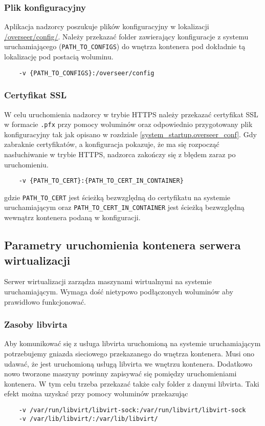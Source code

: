 \documentclass[../opis-rozwiazania.tex]{subfiles}
\begin{document}
\subsubsection{Plik konfiguracyjny}
Aplikacja nadzorcy poszukuje plików konfiguracyjny w lokalizacji \url{/overseer/config/}.
Należy przekazać folder zawierający konfiguracje z systemu uruchamiającego (\texttt{PATH\_TO\_CONFIGS}) do wnętrza kontenera pod dokładnie tą lokalizację pod postacią woluminu.
\begin{verbatim}
	-v {PATH_TO_CONFIGS}:/overseer/config
\end{verbatim}

\subsubsection{Certyfikat SSL}
W celu uruchomienia nadzorcy w trybie HTTPS należy przekazać certyfikat SSL w formacie \texttt{.pfx} przy pomocy woluminów oraz odpowiednio przygotowany plik konfiguracyjny tak jak opisano w rozdziale \ref{system_startup.overseer_conf}.
Gdy zabraknie certyfikatów, a konfiguracja pokazuje, że ma się rozpocząć nasłuchiwanie w trybie HTTPS, nadzorca zakończy się z błędem zaraz po uruchomieniu.

\begin{verbatim}
	-v {PATH_TO_CERT}:{PATH_TO_CERT_IN_CONTAINER}
\end{verbatim}
gdzie \texttt{PATH\_TO\_CERT} jest ścieżką bezwzględną do certyfikatu na systemie uruchamiającym oraz \texttt{PATH\_TO\_CERT\_IN\_CONTAINER} jest ścieżką bezwzględną wewnątrz kontenera podaną w konfiguracji.

\subsection{Parametry uruchomienia kontenera serwera wirtualizacji}
Serwer wirtualizacji zarządza maszynami wirtualnymi na systemie uruchamiającym.
Wymaga dość nietypowo podłączonych woluminów aby prawidłowo funkcjonować.

\subsubsection{Zasoby libvirta}
Aby komunikować się z usługa libvirta uruchomioną na systemie uruchamiającym potrzebujemy gniazda sieciowego przekazanego do wnętrza kontenera.
Musi ono udawać, że jest uruchomioną usługą libvirta we wnętrzu kontenera.
Dodatkowo nowo tworzone maszyny powinny zapisywać się pomiędzy uruchomieniami kontenera.
W tym celu trzeba przekazać także cały folder z danymi libvirta.
Taki efekt można uzyskać przy pomocy woluminów przekazując
\begin{verbatim}
	-v /var/run/libvirt/libvirt-sock:/var/run/libvirt/libvirt-sock
	-v /var/lib/libvirt/:/var/lib/libvirt/
\end{verbatim}
\end{document}
